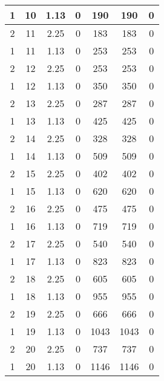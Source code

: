 \documentclass[letterpaper, 12pt]{article}
\begin{document}
\begin{longtable}{|c|c|c|c|c|c|c|}
1 & 10 & 1.13 & 0 & 190 & 190 & 0 \\
\hline
2 & 11 & 2.25 & 0 & 183 & 183 & 0 \\
\hline
1 & 11 & 1.13 & 0 & 253 & 253 & 0 \\
\hline
2 & 12 & 2.25 & 0 & 253 & 253 & 0 \\
\hline
1 & 12 & 1.13 & 0 & 350 & 350 & 0 \\
\hline
2 & 13 & 2.25 & 0 & 287 & 287 & 0 \\
\hline
1 & 13 & 1.13 & 0 & 425 & 425 & 0 \\
\hline
2 & 14 & 2.25 & 0 & 328 & 328 & 0 \\
\hline
1 & 14 & 1.13 & 0 & 509 & 509 & 0 \\
\hline
2 & 15 & 2.25 & 0 & 402 & 402 & 0 \\
\hline
1 & 15 & 1.13 & 0 & 620 & 620 & 0 \\
\hline
2 & 16 & 2.25 & 0 & 475 & 475 & 0 \\
\hline
1 & 16 & 1.13 & 0 & 719 & 719 & 0 \\
\hline
2 & 17 & 2.25 & 0 & 540 & 540 & 0 \\
\hline
1 & 17 & 1.13 & 0 & 823 & 823 & 0 \\
\hline
2 & 18 & 2.25 & 0 & 605 & 605 & 0 \\
\hline
1 & 18 & 1.13 & 0 & 955 & 955 & 0 \\
\hline
2 & 19 & 2.25 & 0 & 666 & 666 & 0 \\
\hline
1 & 19 & 1.13 & 0 & 1043 & 1043 & 0 \\
\hline
2 & 20 & 2.25 & 0 & 737 & 737 & 0 \\
\hline
1 & 20 & 1.13 & 0 & 1146 & 1146 & 0 \\
\hline
\end{longtable}
\end{document}
